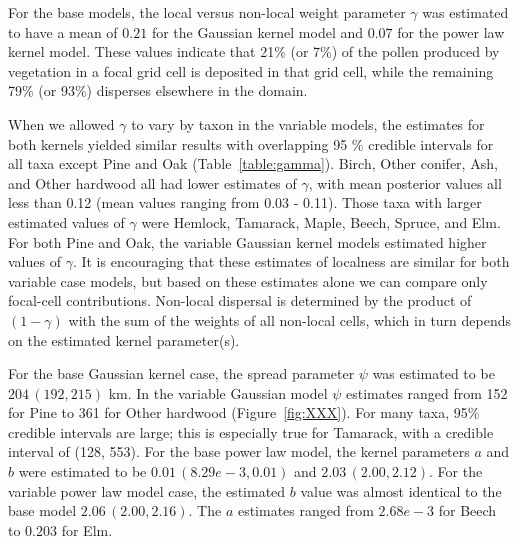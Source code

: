 \documentclass[12pt]{article}
\begin{document}
For the base models, the local versus non-local weight parameter
$\gamma$ was estimated to have a mean of $0.21$ for the Gaussian
kernel model and $0.07$ for the power law kernel model. These values
indicate that 21\% (or 7\%) of the pollen produced by vegetation in a
focal grid cell is deposited in that grid cell, while the remaining
79\% (or 93\%) disperses elsewhere in the domain.

When we allowed $\gamma$ to vary by taxon in the variable models, the
estimates for both kernels yielded similar results with overlapping 95
\% credible intervals for all taxa except Pine and Oak
(Table~\ref{table:gamma}). Birch, Other conifer, Ash, and Other
hardwood all had lower estimates of $\gamma$, with mean posterior
values all less than 0.12 (mean values ranging from 0.03 -
0.11). Those taxa with larger estimated values of $\gamma$ were
Hemlock, Tamarack, Maple, Beech, Spruce, and Elm. For both Pine and
Oak, the variable Gaussian kernel models estimated higher values of
$\gamma$. It is encouraging that these estimates of localness are
similar for both variable case models, but based on these estimates
alone we can compare only focal-cell contributions. Non-local
dispersal is determined by the product of $(1-\gamma)$ with the sum of
the weights of all non-local cells, which in turn depends on the
estimated kernel parameter(s).

For the base Gaussian kernel case, the spread parameter $\psi$ was
estimated to be $204\,(192, 215)$ km. In the variable Gaussian model
$\psi$ estimates ranged from 152 for Pine to 361 for Other hardwood
(Figure~\ref{fig:XXX}). For many taxa, 95\% credible intervals are large;
this is especially true for Tamarack, with a credible interval of
(128, 553). For the base power law model, the kernel parameters $a$
and $b$ were estimated to be $0.01\,(8.29e-3, 0.01)$ and $2.03\,(2.00,
2.12)$. For the variable power law model case, the estimated $b$ value
was almost identical to the base model $2.06\,(2.00, 2.16)$. The $a$
estimates ranged from $2.68e-3$ for Beech to $0.203$ for Elm.
\end{document}
